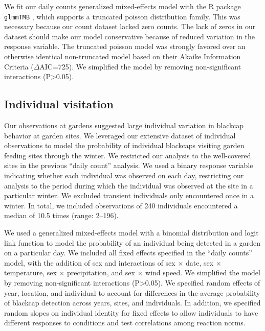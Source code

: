 \documentclass[a4paper, twoside]{templates/ociamthesis}
\begin{document}
We fit our daily counts generalized mixed-effects model with the R package \texttt{glmmTMB} \autocite{brooksGlmmTMBBalancesSpeed2017}, which supports a truncated poisson distribution family. This was necessary because our count dataset lacked zero counts. The lack of zeros in our dataset should make our model conservative because of reduced variation in the response variable. The truncated poisson model was strongly favored over an otherwise identical non-truncated model based on their Akaike Information Criteria (\(\Delta\)AIC=725). We simplified the model by removing non-significant interactions (P\textgreater0.05).

\hypertarget{individual-visitation}{%
\subsection{Individual visitation}\label{individual-visitation}}

Our observations at gardens suggested large individual variation in blackcap behavior at garden sites. We leveraged our extensive dataset of individual observations to model the probability of individual blackcaps visiting garden feeding sites through the winter. We restricted our analysis to the well-covered sites in the previous ``daily count'' analysis. We used a binary response variable indicating whether each individual was observed on each day, restricting our analysis to the period during which the individual was observed at the site in a particular winter. We excluded transient individuals only encountered once in a winter. In total, we included observations of 240 individuals encountered a median of 10.5 times (range: 2--196).

We used a generalized mixed-effects model with a binomial distribution and logit link function to model the probability of an individual being detected in a garden on a particular day. We included all fixed effects specified in the ``daily counts'' model, with the addition of sex and interactions of sex \(\times\) date, sex \(\times\) temperature, sex \(\times\) precipitation, and sex \(\times\) wind speed. We simplified the model by removing non-significant interactions (P\textgreater0.05). We specified random effects of year, location, and individual to account for differences in the average probability of blackcap detection across years, sites, and individuals. In addition, we specified random slopes on individual identity for fixed effects to allow individuals to have different responses to conditions and test correlations among reaction norms.
\end{document}
